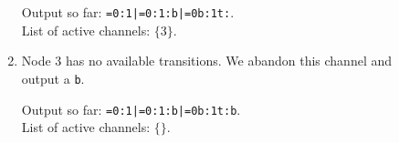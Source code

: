 \begin{example}[Protocol]
\begin{description}
\begin{enumerate}
        Output so far: \texttt{=0:1|=0:1:b|=0b:1t:}. \\
        List of active channels: $\{3\}$.
      \item Node 3 has no available transitions. We abandon this
        channel and output a \texttt{b}.

        Output so far: \texttt{=0:1|=0:1:b|=0b:1t:b}. \\
        List of active channels: $\{\}$.
    \end{enumerate}
  \end{description}
\end{example}

